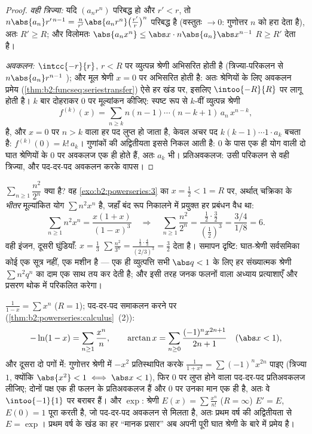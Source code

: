 \begin{proof}
\emph{वही त्रिज्या:} यदि $(a_nr^n)$ परिबद्ध हो और $r' < r$, तो $n\abs{a_n} r'^{\,n-1} = \frac{n}{r'}\abs{a_nr^n}
\bigl(\frac{r'}{r}\bigr)^n$ परिबद्ध है (वस्तुतः
$\to 0$: गुणोत्तर $n$ को हरा देता है), अतः $R' \geq R$; और विलोमतः $\abs{a_n x^n} \leq \abs x
\cdot n\abs{a_n}\abs x^{n-1}$ $R \geq R'$ देता है।

\emph{अवकलन:} $\intcc{-r}{r}$, $r < R$ पर व्युत्पन्न श्रेणी  अभिसरित होती है
(त्रिज्या-परिकलन से $n\abs{a_n}r^{n-1}$ ); और मूल श्रेणी $x = 0$ पर अभिसरित होती है: अतः
श्रेणियों के लिए अवकलन प्रमेय (\cref{thm:b2:funcseq:seriestransfer}) ऐसे हर खंड पर, इसलिए $\intoo{-R}{R}$ पर लागू होती
है। $k$ बार दोहराकर $0$ पर मूल्यांकन कीजिए: स्पष्ट रूप से $k$-वीं
व्युत्पन्न श्रेणी
\[
f^{(k)}(x) = \sum_{n\geq k} n(n-1)\cdots(n-k+1)\,a_n\,x^{n-k},
\]
है, और $x = 0$ पर $n > k$ वाला हर पद लुप्त हो जाता है, केवल अचर पद $k(k-1)\cdots1\cdot a_k$ बचता है:
$f^{(k)}(0) =
k!\,a_k$। गुणांकों की अद्वितीयता इससे निकल आती है: $0$ के पास एक ही योग वाली
दो घात श्रेणियों के $0$ पर अवकलज एक ही होते हैं, अतः $a_k$ भी। प्रतिअवकलज:
उसी परिकलन से वही त्रिज्या, और पद-दर-पद अवकलन करके वापस।
\end{proof}

\begin{example}[किसी बिंदु पर श्रेणी का मूल्यांकन]\label{ex:b2:powerseries:evaluate}
$\sum_{n\geq1}\dfrac{n^2}{2^n}$ क्या है? वह \cref{exo:b2:powerseries:3} का $x = \frac12 < 1 = R$ पर, अर्थात् चक्रिका के \emph{भीतर} मूल्यांकित
योग $\sum n^2x^n$ है, जहाँ बंद रूप निकालने में प्रयुक्त हर प्रबंधन वैध था:
\[
\sum_{n\geq1} n^2x^n = \frac{x(1+x)}{(1-x)^3}
\quad\Longrightarrow\quad
\sum_{n\geq1}\frac{n^2}{2^n}
= \frac{\frac12\cdot\frac32}{(\frac12)^3}
= \frac{3/4}{1/8} = 6 .
\]
वही इंजन, दूसरी घुंडियाँ: $x = \frac13$ $\sum\frac{n^2}{3^n} = \frac{\frac13\cdot\frac43}{(2/3)^3} =
\frac32$ देता है। समापन दृष्टि: घात-श्रेणी
सर्वसमिका कोई एक सूत्र नहीं, एक मशीन है --- एक ही व्युत्पत्ति सभी $\abs q < 1$ के
लिए हर संख्यात्मक श्रेणी $\sum n^2q^n$ का दाम एक साथ तय कर देती है; और इसी तरह जनक
फलनों वाला अध्याय प्रत्याशाएँ और प्रसरण थोक में परिकलित करेगा।
\end{example}

\begin{example}[क्लासिक, इस बार ईमानदारी से]\label{ex:b2:powerseries:classics}
$\displaystyle\frac{1}{1 - x} = \sum x^n$ ($R = 1$); पद-दर-पद समाकलन करने पर (\cref{thm:b2:powerseries:calculus}~(2)):
\[
-\ln(1 - x) = \sum_{n\geq1} \frac{x^n}{n},
\qquad
\arctan x = \sum_{n \geq 0} \frac{(-1)^n x^{2n+1}}{2n+1}
\quad (\abs x < 1),
\]
और दूसरा दो पगों में: गुणोत्तर श्रेणी में $-x^2$ प्रतिस्थापित करके $\frac{1}{1+x^2} = \sum(-1)^nx^{2n}$
पाइए (त्रिज्या $1$, क्योंकि $\abs{x^2} < 1 \iff \abs x < 1$), फिर $0$ पर लुप्त होने वाला पद-दर-पद
प्रतिअवकलज लीजिए; दोनों पक्ष एक ही फलन के प्रतिअवकलज हैं और $0$ पर उनका
मान एक ही है, अतः वे $\intoo{-1}{1}$ पर बराबर हैं। और $\exp$: श्रेणी $E(x) = \sum \frac{x^n}{n!}$ ($R = \infty$) $E' = E$,
$E(0) = 1$ पूरा करती है, जो पद-दर-पद अवकलन से मिलता है, अतः प्रथम वर्ष की
अद्वितीयता से $E = \exp$। प्रथम वर्ष के खंड का हर ``मानक प्रसार'' अब अपनी पूरी
घात श्रेणी के बारे में प्रमेय है।
\end{example}

